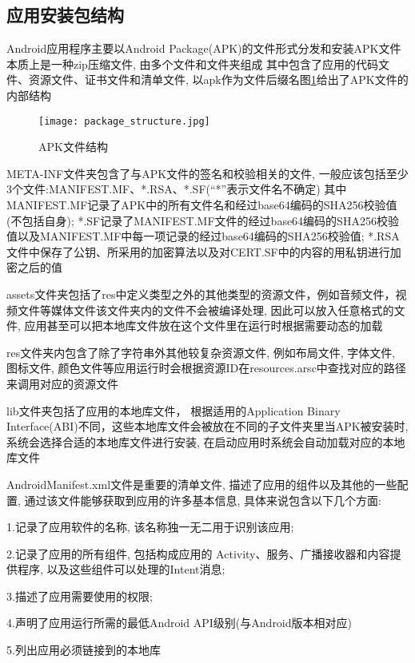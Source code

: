 \subsection{应用安装包结构}
Android应用程序主要以Android Package(APK)的文件形式分发和安装\juhao APK文件本质上是一种zip压缩文件, 由多个文件和文件夹组成 其中包含了应用的代码文件、资源文件、证书文件和清单文件, 以apk作为文件后缀名\juhao 图\ref{packageStructure}给出了APK文件的内部结构\juhao
\begin{figure}[ht]
	\centering
	\texttt{[image: package\_structure.jpg]}
	\caption{APK文件结构}
	\label{packageStructure}
\end{figure}

META-INF文件夹包含了与APK文件的签名和校验相关的文件, 一般应该包括至少3个文件:MANIFEST.MF、*.RSA、*.SF(“*”表示文件名不确定)\juhao 
其中MANIFEST.MF记录了APK中的所有文件名和经过base64编码的SHA256校验值(不包括自身);
*.SF记录了MANIFEST.MF文件的经过base64编码的SHA256校验值以及MANIFEST.MF中每一项记录的经过base64编码的SHA256校验值;
*.RSA文件中保存了公钥、所采用的加密算法以及对CERT.SF中的内容的用私钥进行加密之后的值\juhao

assets文件夹包括了res中定义类型之外的其他类型的资源文件，例如音频文件，视频文件等媒体文件\juhao 该文件夹内的文件不会被编译处理, 因此可以放入任意格式的文件, 应用甚至可以把本地库文件放在这个文件里在运行时根据需要动态的加载\juhao

res文件夹内包含了除了字符串外其他较复杂资源文件, 例如布局文件, 字体文件, 图标文件, 颜色文件等\juhao 应用运行时会根据资源ID在resources.arsc中查找对应的路径来调用对应的资源文件\juhao

lib文件夹包括了应用的本地库文件， 根据适用的Application Binary Interface(ABI)不同，这些本地库文件会被放在不同的子文件夹里\juhao 当APK被安装时, 系统会选择合适的本地库文件进行安装, 在启动应用时系统会自动加载对应的本地库文件\juhao

AndroidManifest.xml文件是重要的清单文件, 描述了应用的组件以及其他的一些配置, 通过该文件能够获取到应用的许多基本信息, 具体来说包含以下几个方面:

1.记录了应用软件的名称, 该名称独一无二用于识别该应用;

2.记录了应用的所有组件, 包括构成应用的 Activity、服务、广播接收器和内容提供程序, 以及这些组件可以处理的Intent消息;

3.描述了应用需要使用的权限;

4.声明了应用运行所需的最低Android API级别(与Android版本相对应)

5.列出应用必须链接到的本地库

